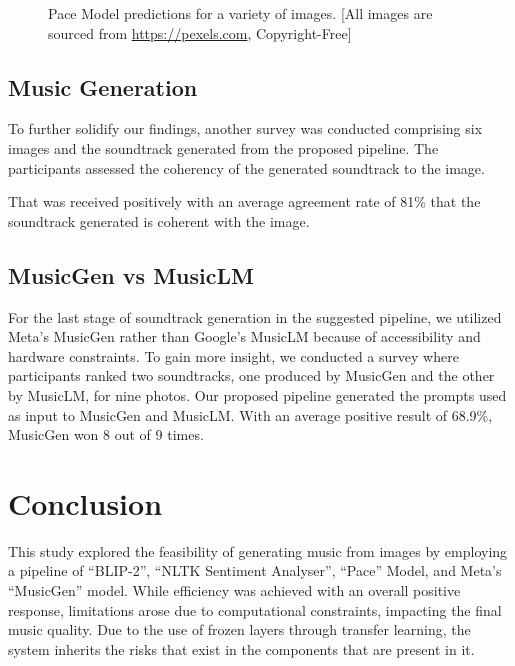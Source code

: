 \documentclass[conference]{IEEEtran}
\begin{document}
\begin{figure}[ht]
    \centering
    \caption{Pace Model predictions for a variety of images. [All images are sourced from \url{https://pexels.com}, Copyright-Free]}
    \label{fig:pace-model-predictions}
\end{figure}

\subsection*{Music Generation}

To further solidify our findings, another survey was conducted comprising six images and the soundtrack generated from the proposed pipeline. The participants assessed the coherency of the generated soundtrack to the image.

That was received positively with an average agreement rate of 81\% that the soundtrack generated is coherent with the image.

\subsection*{MusicGen vs MusicLM}

For the last stage of soundtrack generation in the suggested pipeline, we utilized Meta's MusicGen rather than Google's MusicLM because of accessibility and hardware constraints. To gain more insight, we conducted a survey where participants ranked two soundtracks, one produced by MusicGen and the other by MusicLM, for nine photos. Our proposed pipeline generated the prompts used as input to MusicGen and MusicLM. With an average positive result of 68.9\%, MusicGen won 8 out of 9 times.

\section*{Conclusion}

This study explored the feasibility of generating music from images by employing a pipeline of ``BLIP-2'', ``NLTK Sentiment Analyser'', ``Pace'' Model, and Meta's ``MusicGen'' model. While efficiency was achieved with an overall positive response, limitations arose due to computational constraints, impacting the final music quality. Due to the use of frozen layers through transfer learning, the system inherits the risks that exist in the components that are present in it.
\\
\end{document}
